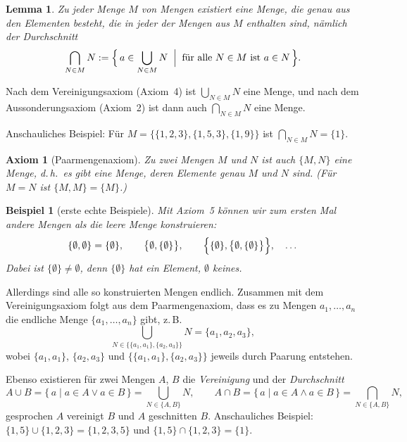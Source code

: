 \documentclass[a4paper]{article}
\makeatletter
\theoremstyle{kurzskript}
\newtheorem{lemma}[satz]{Lemma}
\newtheorem{axiom}{Axiom}                    %
\newtheorem*{bsp}{Beispiel}
\renewenvironment{proof}[1][\proofname]{\par\pushQED{\qed}%
  \normalfont\topsep\medskipamount\relax
  \trivlist\item[\hskip\labelsep\bfseries #1\@addpunct{.}]\ignorespaces}%
  {\popQED\endtrivlist\@endpefalse}
\renewcommand{\proofname}{Beweis}
\makeatother
\begin{document}
\begin{lemma}
Zu jeder Menge $M$ von Mengen existiert eine Menge, die genau aus den Elementen besteht, die in jeder der Mengen aus $M$ enthalten sind, nämlich der \emph{Durchschnitt}
\[
  \bigcap_{N \in M} N := \Bigl\{\, a \in \bigcup_{N \in M} N \;\Bigm|\; \text{für alle } N \in M \text{ ist } a \in N \,\Bigr\}.
\]
\end{lemma}

\begin{proof}
Nach dem Vereinigungsaxiom (Axiom~4) ist $\bigcup_{N \in M} N$ eine Menge, und nach dem Aussonderungsaxiom (Axiom~2) ist dann auch $\bigcap_{N \in M} N$ eine Menge.
\end{proof}

Anschauliches Beispiel: Für $M = \bigl\{\{1, 2, 3\}, \{1, 5, 3\}, \{1, 9\}\bigr\}$ ist $\bigcap_{N \in M} N = \{1\}$.

\begin{axiom}[Paarmengenaxiom]
Zu zwei Mengen $M$ und $N$ ist auch $\{M, N\}$ eine Menge, d.\,h.\ es gibt eine Menge, deren Elemente genau $M$ und $N$ sind. (Für $M = N$ ist $\{M, M\} = \{M\}$.)
\end{axiom}

\begin{bsp}[erste echte Beispiele]
Mit Axiom~5 können wir zum ersten Mal andere Mengen als die leere Menge konstruieren:
\[
  \{\emptyset, \emptyset\} = \{\emptyset\}, \qquad \bigl\{\emptyset, \{\emptyset\}\bigr\}, \qquad \Bigl\{\{\emptyset\}, \bigl\{\emptyset, \{\emptyset\}\bigr\}\Bigr\}, \quad \dots
\]
Dabei ist $\{\emptyset\} \neq \emptyset$, denn $\{\emptyset\}$ hat ein Element, $\emptyset$ keines.
\end{bsp}

Allerdings sind alle so konstruierten Mengen endlich. Zusammen mit dem Vereinigungsaxiom folgt aus dem Paarmengenaxiom, dass es zu Mengen $a_1, \dots, a_n$ die endliche Menge $\{a_1, \dots, a_n\}$ gibt, z.\,B.
\[
  \bigcup_{N \in \{\{a_1, a_1\}, \{a_2, a_3\}\}} N = \{a_1, a_2, a_3\},
\]
wobei $\{a_1, a_1\}$, $\{a_2, a_3\}$ und $\bigl\{\{a_1, a_1\}, \{a_2, a_3\}\bigr\}$ jeweils durch Paarung entstehen.

Ebenso existieren für zwei Mengen $A$, $B$ die \emph{Vereinigung} und der \emph{Durchschnitt}
\[
  A \cup B = \{\, a \mid a \in A \lor a \in B \,\} = \bigcup_{N \in \{A, B\}} N, \qquad
  A \cap B = \{\, a \mid a \in A \land a \in B \,\} = \bigcap_{N \in \{A, B\}} N,
\]
gesprochen \glqq$A$ vereinigt $B$\grqq{} und \glqq$A$ geschnitten $B$\grqq. Anschauliches Beispiel: $\{1, 5\} \cup \{1, 2, 3\} = \{1, 2, 3, 5\}$ und $\{1, 5\} \cap \{1, 2, 3\} = \{1\}$.
\end{document}
